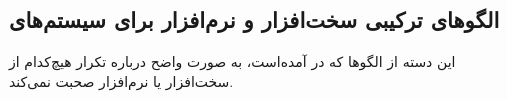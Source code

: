 \subsection{الگوهای ترکیبی سخت‌افزار و نرم‌افزار برای سیستم‌های }
\begin{RTL}
این دسته از الگوها که در \cite{ref5} آمده‌است، به صورت واضح درباره
تکرار هیچ‌کدام از سخت‌افزار یا نرم‌افزار صحبت نمی‌کند.
\end{RTL}

